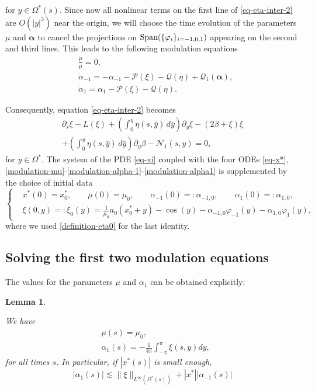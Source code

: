 \documentclass[12pt]{amsart}
\numberwithin{equation}{section}
\numberwithin{equation}{section}
\newtheorem{lem}[thm]{Lemma}
\begin{document}
for $y\in \Omega^*(s)$. Since now all nonlinear terms on the  first line  of \eqref{eq-eta-inter-2} are $O(|y|^3)$ near the origin, we will choose the time evolution of the parameters $\mu$ and $\boldsymbol{\alpha}$ to cancel the projections on $\textup{Span}(\{\varphi_{i}\}_{i=-1,0,1})$ appearing on the second and third lines. This leads to the following modulation equations
\begin{align}
\label{modulation-mu} & \frac{\dot\mu}{\mu}= 0,\\
 \label{modulation-alpha-1} &\dot\alpha_{-1}=-\alpha_{-1}-\mathcal P(\xi)-\mathcal Q(\eta)+\mathcal Q_1(\boldsymbol{\alpha}), \\
  \label{modulation-alpha1} &\dot\alpha_{1}=\alpha_{1}-\mathcal P (\xi)-\mathcal Q (\eta).
\end{align}

Consequently,   equation \eqref{eq-eta-inter-2} becomes  
\begin{multline}\label{eq-xi}
 \partial_s \xi - L (\xi) + \left(\int_{0}^y \eta(s,  \bar y) \,d\bar y\right) \partial_y \xi -\left(2 \beta+\xi \right)\xi\\
 + \left(\int_{0}^y \eta (s, \bar y) \,d\bar y\right) \partial_y \beta- \mathcal{N}_1(s, y)=0,
\end{multline}
for $y\in\Omega^*.$
The system of the PDE \eqref{eq-xi} coupled with the four ODEs \eqref{eq-x*}, \eqref{modulation-mu}-\eqref{modulation-alpha-1}-\eqref{modulation-alpha1}  is supplemented by the choice of initial data
\begin{equation}\label{definition-xi0}
\left\{
\begin{aligned}
&x^*(0)=x^*_0, \qquad \mu(0)=\mu_0, \qquad \alpha_{-1}(0)=:\alpha_{-1,0}, \qquad  \alpha_{1}(0)=:\alpha_{1,0},\\
& \xi(0,y)=:\xi_0(y)=\frac{1}{\mu_0}a_0(x_0^*+y)-\cos(y)- \alpha_{-1,0}\varphi_{-1}(y)-\alpha_{1,0} \varphi_1(y),
\end{aligned}\right.
\end{equation}
where we used \eqref{definition-eta0} for the last identity.



\subsection{Solving the first two modulation equations} 

The values for the parameters $\mu$ and $\alpha_{1}$ can be obtained explicitly:

\begin{lem} \label{lem:mu-alpha1}

We have
\begin{align} \label{solution-modulation-mu}
& \mu(s)=\mu_0 ,\\
  \label{solution-modulation-alpha1}
& \alpha_1(s)=-\frac{1}{4\pi}\int_{-\pi}^\pi \xi(s,y)dy ,
\end{align}
for all times $s$. In particular, if $|x^*(s)|$ is small enough,
\begin{equation}  \label{solution-modulation-alpha1-bis}
| \alpha_1(s)|\lesssim \| \xi\|_{L^\infty(\Omega^*(s))}+|x^*||\alpha_{-1}(s)|
\end{equation}
\end{lem}
\end{document}
